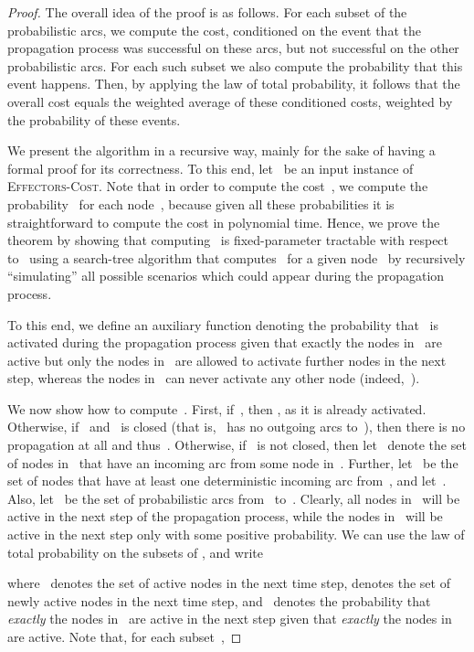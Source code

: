 \documentclass{article}
\newcommand{\probCost}{\textsc{Effectors-Cost}\xspace}
\begin{document}
\begin{proof}
  The overall idea of the proof is as follows.
  For each subset of the probabilistic arcs,
  we compute the cost,
  conditioned on the event that the propagation process was successful on these arcs,
  but not successful on the other probabilistic arcs.
  For each such subset we also compute the probability that this event happens.
  Then,
  by applying the law of total probability,
  it follows that the overall cost equals
  the weighted average of these conditioned costs,
  weighted by the probability of these events.
  
  We present the algorithm in a recursive way,
  mainly for the sake of having a formal proof for its correctness.
  To this end,
  let~ be an input instance of \probCost.
  Note that in order to compute the cost~, we
  compute the probability~ for each node~,
  because given all these probabilities
  it is straightforward to compute the cost in polynomial time.
  Hence, we prove the theorem by showing that computing~
  is fixed-parameter tractable with respect to~
  using a search-tree algorithm that computes~
  for a given node~ by recursively ``simulating'' all possible scenarios which
  could appear during the propagation process.
  
  To this end,
  we define an auxiliary function
   denoting the probability that~ is
  activated during the propagation process given that exactly the
  nodes in~ are active but only the nodes in~ are
  allowed to activate further nodes in the next step,
  whereas the nodes in~ can never activate any other node
  (indeed,~).

  We now show how to compute~.
  First, if~, then , as it is already activated.
  Otherwise, if~ and~ is closed (that is,~ has no
  outgoing arcs to~),
  then there is no propagation at all and thus~.
  Otherwise, if~ is not closed, then let~ denote
  the set of nodes in~ that have an
  incoming arc from some node in~.
  Further, let~ be the set of nodes that
  have at least one deterministic incoming arc from~, and
  let~.
  Also, let~ be the set of probabilistic arcs from~ to~.
  Clearly, all nodes in~ will be active in the next step of the
  propagation process, while the nodes in~ will be active in the
  next step only with some positive probability.
  We can use the law of total probability on the subsets of ,
  and write
  
  where~ denotes the set of active nodes in the next time step,
   denotes the set of newly active nodes in the next time step,
  and~ denotes the probability that \emph{exactly} the nodes
  in~ are active in the next step given that \emph{exactly} the nodes
  in~ are active.
  Note that, for each subset~,
  

\end{proof}
\end{document}
